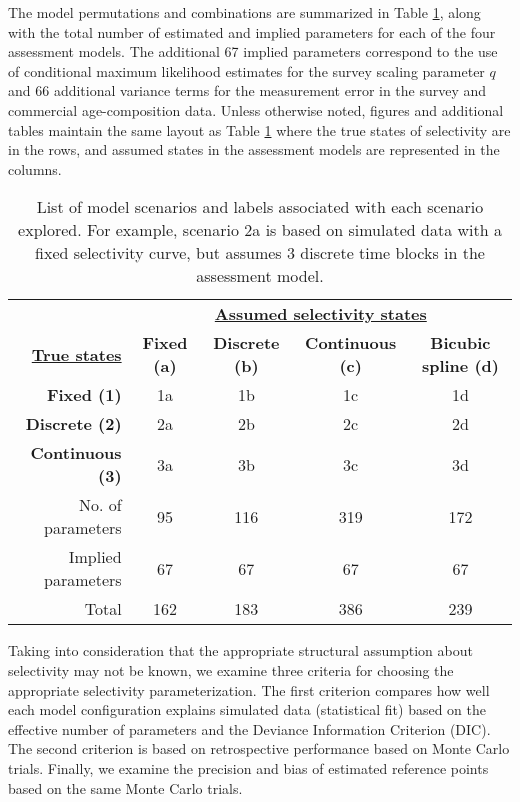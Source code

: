 The model permutations and combinations are summarized in Table \ref{tab:scenarios}, along with the total number of estimated and implied parameters for each of the four assessment models.  The additional 67 implied parameters correspond to the use of conditional maximum likelihood estimates for the survey scaling parameter $q$ and 66 additional variance terms for the measurement error in the survey and commercial age-composition data.  Unless otherwise noted, figures and additional tables maintain the same layout as Table \ref{tab:scenarios} where the true states of selectivity are in the rows, and assumed states in the assessment models are represented in the columns.

\begin{table}[!tbh]
	\caption{List of model scenarios and labels associated with each scenario explored.  For example, scenario 2a is based on simulated data with a fixed selectivity curve, but assumes 3 discrete time blocks in the assessment model.}
	\label{tab:scenarios}
	\begin{center}
		\begin{tabular}{r|cccc}
		\hline

		\hline
		
		&\multicolumn{4}{c}{\textbf{\underline{Assumed selectivity states}}}\\
		\textbf{\textbf{\underline{True states}}}
		&\textbf{Fixed (a)} & \textbf{Discrete (b)} & \textbf{Continuous (c)} & \textbf{Bicubic spline (d)} \\
		\hline
		 \textbf{Fixed (1)}      & 1a & 1b & 1c & 1d\\
		 \textbf{Discrete (2)}   & 2a & 2b & 2c & 2d\\
		 \textbf{Continuous (3)} & 3a & 3b & 3c & 3d\\
		\hline

		\hline
		No. of parameters & 95 & 116 & 319 & 172\\
		Implied parameters & 67 &67 &67 & 67 \\
		\hline
		Total  & 162 & 183 &  386 & 239 \\
		\hline

		\hline
		\end{tabular}
	\end{center}
\end{table}

Taking into consideration that the appropriate structural assumption about selectivity may not be known, we examine three criteria for choosing the appropriate selectivity parameterization.  The first criterion compares how well each model configuration explains simulated data (statistical fit) based on the effective number of parameters and the  Deviance Information Criterion (DIC).  The second criterion is based on retrospective performance based on Monte Carlo trials. Finally, we examine the precision and bias of estimated reference points based on the same Monte Carlo trials.

